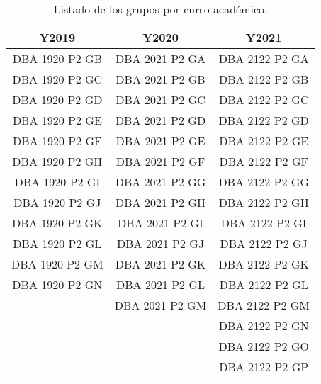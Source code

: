 \begin{table}[H]
\centering
\caption{Listado de los grupos por curso académico.}
\label{tab:groups2}
\begin{tabular}{ccc}
\hline
\textbf{Y2019} & \textbf{Y2020} & \textbf{Y2021} \\ \hline
DBA 1920 P2 GB & DBA 2021 P2 GA & DBA 2122 P2 GA \\
DBA 1920 P2 GC & DBA 2021 P2 GB & DBA 2122 P2 GB \\
DBA 1920 P2 GD & DBA 2021 P2 GC & DBA 2122 P2 GC \\
DBA 1920 P2 GE & DBA 2021 P2 GD & DBA 2122 P2 GD \\
DBA 1920 P2 GF & DBA 2021 P2 GE & DBA 2122 P2 GE \\
DBA 1920 P2 GH & DBA 2021 P2 GF & DBA 2122 P2 GF \\
DBA 1920 P2 GI & DBA 2021 P2 GG & DBA 2122 P2 GG \\
DBA 1920 P2 GJ & DBA 2021 P2 GH & DBA 2122 P2 GH \\
DBA 1920 P2 GK & DBA 2021 P2 GI & DBA 2122 P2 GI \\
DBA 1920 P2 GL & DBA 2021 P2 GJ & DBA 2122 P2 GJ \\
DBA 1920 P2 GM & DBA 2021 P2 GK & DBA 2122 P2 GK \\
DBA 1920 P2 GN & DBA 2021 P2 GL & DBA 2122 P2 GL \\
			   & DBA 2021 P2 GM & DBA 2122 P2 GM \\
			   &         		& DBA 2122 P2 GN \\
			   & 				& DBA 2122 P2 GO \\
			   &				& DBA 2122 P2 GP \\ \hline
\end{tabular}
\end{table}

